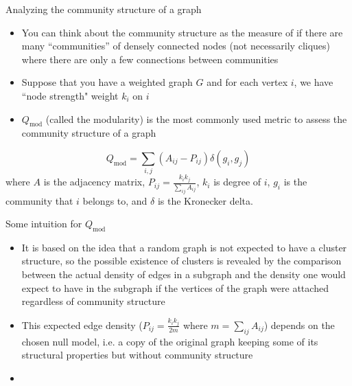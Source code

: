 \documentclass{beamer}
\begin{document}
\begin{frame}{Analyzing the community structure of a graph}
    \begin{itemize}
        \item You can think about the community structure as the measure of if there are many ``communities'' of densely connected nodes (not necessarily cliques) where there are only a few connections between communities \pause
        \item Suppose that you have a weighted graph $G$ and for each vertex $i$, we have ``node strength" weight $k_i$ on $i$ \pause
        \item $Q_{\mathrm{mod}}$ (called the modularity) is the most commonly used metric to assess the community structure of a graph\cite{community} \pause
    \end{itemize}
    \[Q_{\mathrm{mod}} = \sum_{i,j} \left(A_{ij} - P_{ij}\right)\delta(g_i, g_j)\]
    where $A$ is the adjacency matrix, $P_{ij} = \frac{k_i k_j}{\sum_{ij}A_{ij}}$, $k_i$ is degree of $i$, $g_i$ is the community that $i$ belongs to, and $\delta$ is the Kronecker delta.
\end{frame}

\begin{frame}{Some intuition for $Q_{\mathrm{mod}}$}
    \begin{itemize}
        \item It is based on the idea that a random graph is not expected to have a cluster structure, so the possible existence of clusters is revealed by the comparison between the actual density of edges in a subgraph and the density one would expect to have in the subgraph if the vertices of the graph
        were attached regardless of community structure
        \item This expected edge density ($P_{ij} = \frac{k_ik_j}{2m}$ where $m = \sum_{ij}A_{ij}$) depends on the chosen null model, i.e. a copy of the original graph keeping some of its structural properties but without community structure\cite{community}
        \item 
    \end{itemize}
\end{frame}
\end{document}
